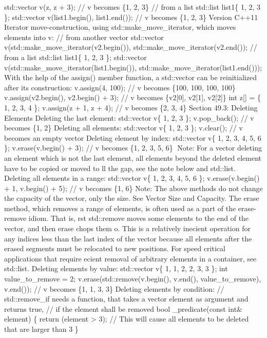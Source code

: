 std::vector v(z, z + 3); // v becomes \{1, 2, 3\} // from a list
std::list list1\{ 1, 2, 3 \}; std::vector v(list1.begin(), list1.end());
// v becomes \{1, 2, 3\} Version C++11 Iterator move-construction, using
std::make\_move\_iterator, which moves elements into v: // from another
vector std::vector v(std::make\_move\_iterator(v2.begin()),
std::make\_move\_iterator(v2.end()); // from a list std::list list1\{ 1,
2, 3 \}; std::vector v(std::make\_move\_iterator(list1.begin()),
std::make\_move\_iterator(list1.end())); With the help of the assign()
member function, a std::vector can be reinitialized after its
construction: v.assign(4, 100); // v becomes \{100, 100, 100, 100\}
v.assign(v2.begin(), v2.begin() + 3); // v becomes \{v2{[}0{]},
v2{[}1{]}, v2{[}2{]}\} int z{[}{]} = \{ 1, 2, 3, 4 \}; v.assign(z + 1, z
+ 4); // v becomes \{2, 3, 4\} Section 49.3: Deleting Elements Deleting
the last element: std::vector v\{ 1, 2, 3 \}; v.pop\_back(); // v
becomes \{1, 2\} Deleting all elements: std::vector v\{ 1, 2, 3 \};
v.clear(); // v becomes an empty vector Deleting element by index:
std::vector v\{ 1, 2, 3, 4, 5, 6 \}; v.erase(v.begin() + 3); // v
becomes \{1, 2, 3, 5, 6\} Note: For a vector deleting an element which
is not the last element, all elements beyond the deleted element have to
be copied or moved to ll the gap, see the note below and std::list.
Deleting all elements in a range: std::vector v\{ 1, 2, 3, 4, 5, 6 \};
v.erase(v.begin() + 1, v.begin() + 5); // v becomes \{1, 6\} Note: The
above methods do not change the capacity of the vector, only the size.
See Vector Size and Capacity. The erase method, which removes a range of
elements, is often used as a part of the erase-remove idiom. That is,
rst std::remove moves some elements to the end of the vector, and then
erase chops them o. This is a relatively inecient operation for any
indices less than the last index of the vector because all elements
after the erased segments must be relocated to new positions. For speed
critical applications that require ecient removal of arbitrary elements
in a container, see std::list. Deleting elements by value: std::vector
v\{ 1, 1, 2, 2, 3, 3 \}; int value\_to\_remove = 2;
v.erase(std::remove(v.begin(), v.end(), value\_to\_remove), v.end()); //
v becomes \{1, 1, 3, 3\} Deleting elements by condition: //
std::remove\_if needs a function, that takes a vector element as
argument and returns true, // if the element shall be removed bool
\_predicate(const int\& element) \{ return (element \textgreater{} 3);
// This will cause all elements to be deleted that are larger than 3 \}
